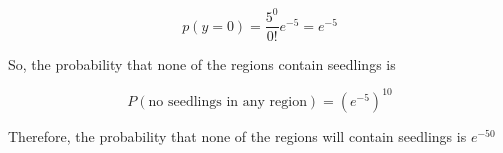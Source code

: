 \documentclass{article}
\begin{document}
\begin{enumerate}
\begin{enumerate}[label=3.\arabic*]
		            \begin{equation}
			            p(y = 0) = \frac{5^0}{0!}e^{-5} = e^{-5}
		            \end{equation}

		            So, the probability that none of the regions contain seedlings is

		            \begin{equation}
			            P(\text{no seedlings in any region}) = (e^{-5})^10
		            \end{equation}

		            Therefore, the probability that none of the regions will contain seedlings is $e^{-50}$
	      \end{enumerate}
\end{enumerate}
\end{document}
